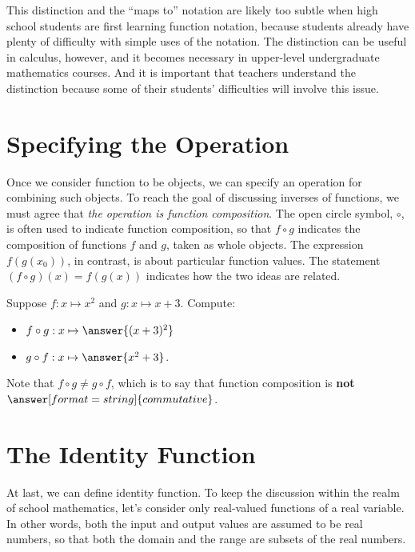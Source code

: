 \documentclass{ximera}
\begin{document}
This distinction and the ``maps to'' notation are likely too subtle when high school students are first learning function notation, because students already have plenty of difficulty with simple uses of the notation.  The distinction can be useful in calculus, however, and it becomes necessary in upper-level undergraduate mathematics courses.  And it is important that teachers understand the distinction because some of their students' difficulties will involve this issue.


\section*{Specifying the Operation}
Once we consider function to be objects, we can specify an operation for combining such objects.  To reach the goal of discussing inverses of functions, we must agree that \emph{the operation is function composition}.  The open circle symbol, $\circ$, is often used to indicate function composition, so that $f\circ g$  indicates the composition of functions $f$ and $g$, taken as whole objects.  The expression $f(g(x_0))$, in contrast, is about particular function values.  The statement $(f\circ g)(x) = f(g(x))$ indicates how the two ideas are related.  

\begin{question}
Suppose $f: x\mapsto x^2$ and $g: x\mapsto x+3$.  Compute: 
\begin{itemize}
\item $f\circ g: x\mapsto \answer{(x+3)^2}$ 
\item $g\circ f: x\mapsto \answer{x^2+3}$. 
\end{itemize}

\begin{question}
Note that $f\circ g \neq g\circ f$, which is to say that function composition is \textbf{not} 
$\answer[format=string]{commutative}$.  
\end{question}
\end{question}

\section*{The Identity Function}
At last, we can define identity function.  To keep the discussion within the realm of school mathematics, let's consider only real-valued functions of a real variable.  In other words, both the input and output values are assumed to be real numbers, so that both the domain and the range are subsets of the real numbers.  
\end{document}
